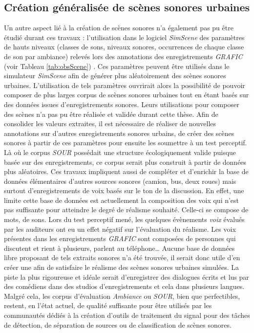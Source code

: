 \subsection*{Création généralisée de scènes sonores urbaines}
Un autre aspect lié à la création de scènes sonores n'a également pas pu être étudié durant ces travaux :  l'utilisation dans le logiciel \textit{SimScene} des paramètres de hauts niveaux (classes de sons, niveaux sonores, occurrences de chaque classe de son par ambiance) relevés lors des annotations des enregistrements \textit{GRAFIC} (voir Tableau \ref{tab:obsScene}) .
Ces paramètres peuvent être utilisés dans le simulateur \textit{SimScene} afin de générer plus aléatoirement des scènes sonores urbaines. L'utilisation de tels paramètres ouvrirait alors la possibilité de pouvoir composer de plus larges corpus de scènes sonores urbaines tout en étant basés sur des données issues d'enregistrements sonores. Leurs utilisations pour composer des scènes n'a pas pu être réalisée et validée durant cette thèse. Afin de consolider les valeurs extraites, il est nécessaire de réaliser de nouvelles annotations sur d'autres enregistrements sonores urbains, de créer des scènes sonores à partir de ces paramètres pour ensuite les soumettre à un test perceptif. Là où le corpus \textit{SOUR} possédait une structure écologiquement valide puisque basée sur des enregistrements, ce corpus serait plus construit à partir de données plus aléatoires.
Ces travaux impliquent aussi de compléter et d'enrichir la base de données élémentaires d'autres sources sonores (camion, bus, deux roues) mais surtout d'enregistrements de voix basés sur le ton de la discussion. En effet, une limite cette base de données est actuellement la composition des voix qui n'est pas suffisante pour atteindre le degré de réalisme souhaité. Celle-ci se compose de mots, de sons. Lors du test perceptif mené, les quelques évènements \textit{voix} évalués par les auditeurs ont eu un effet négatif sur l'évaluation du réalisme. Les voix présentes dans les enregistrements \textit{GRAFIC} sont composées de personnes qui discutent et rient à plusieurs, parlent au téléphone\dots{} 
Aucune base de données libre proposant de tels extraits sonores n'a été trouvée, il serait donc utile d'en créer une afin de satisfaire le réalisme des scènes sonores urbaines simulées. La piste la plus rigoureuse et idéale serait d'enregistrer des dialogues écrits et lus par des comédiens dans des studios d'enregistrements et cela dans plusieurs langues. Malgré cela, les corpus d'évaluation \textit{Ambiance} ou \textit{SOUR}, bien que perfectibles, restent, en l'état actuel, de qualité suffisante pour être utilisés par les communautés dédiés à la création d'outils de traitement du signal pour des tâches de détection, de séparation de sources ou de classification de scènes sonores.

